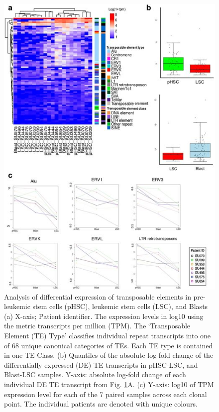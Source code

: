 \begin{figure}[h!]
\centering
\includegraphics[scale=0.8]{tex/tes/41598_2017_7356_Fig1_HTML.jpg}
\caption{Analysis of differential expression of transposable elements in pre-leukemic stem cells (pHSC), leukemic stem cells (LSC), and Blasts (a) X-axis; Patient identifier.  The expression levels in log10 using the metric transcripts per million (TPM).  The `Transposable Element (TE) Type' classifies individual repeat transcripts into one of 68 unique canonical categories of TEs. Each TE type is contained in one TE Class. (b) Quantiles of the absolute log-fold change of the differentially expressed (DE) TE transcripts in pHSC-LSC, and Blast-LSC samples. Y-axis: absolute log-fold change of each individual DE TE transcript from Fig. \ref{fig:tes1}A. (c) Y-axis: log10 of TPM expression level for each of the 7 paired samples across each clonal point.  The individual patients are denoted with unique colours.}
\label{fig:tes1}
\end{figure}


